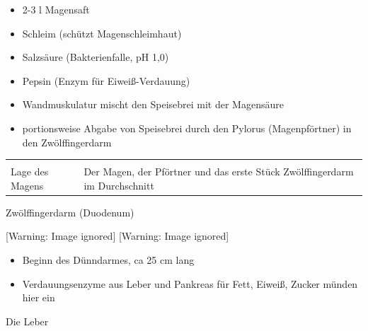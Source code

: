 \documentclass{article}
\begin{document}
\begin{itemize}
\item 2-3 l Magensaft

\item Schleim (sch\"utzt  Magenschleimhaut)

\item Salzs\"aure (Bakterienfalle, pH 1,0)

\item Pepsin  (Enzym f\"ur Eiwei{\ss}-Verdauung)

\item Wandmuskulatur mischt den Speisebrei mit der Magens\"aure

\item portionsweise Abgabe von Speisebrei durch den Pylorus
(Magenpf\"ortner) in den Zw\"olffingerdarm

\end{itemize}
\begin{center}
\tablehead{}\begin{supertabular}{|m{6.649cm}|m{6.651cm}|}
\hline
 &
\\\hline
{}%
 \par

 &
 \par

\\\hline
Lage des Magens

 &
Der Magen, der Pf\"ortner und das erste St\"uck Zw\"olffingerdarm im
Durchschnitt

\\\hline
\end{supertabular}
\end{center}
Zw\"olffingerdarm (Duodenum)

  [Warning: Image ignored] %
   [Warning: Image ignored] %
 

\begin{itemize}
\item Beginn des D\"unndarmes, ca 25 cm lang

\item Verdauungsenzyme aus Leber und Pankreas f\"ur Fett, Eiwei{\ss},
Zucker m\"unden hier ein

\end{itemize}
Die Leber 
\end{document}

